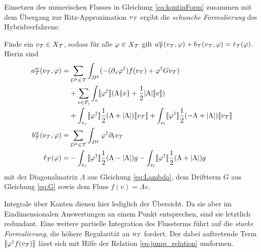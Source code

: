 Einsetzen des numerischen Flusses in Gleichung \eqref{eq:kontinForm} zusammen mit dem Übergang zur Ritz-Approximation $v_{\mathcal{T}}$ ergibt die \emph{schwache Formulierung} des Hybridverfahrens:
\begin{problem}
  \label{prob:weak}
  Finde ein ${v_{\mathcal{T}}\in X_{\mathcal{T}}}$, sodass für alle $\varphi\in X_{\mathcal{T}}$ gilt $a_{\mathcal{T}}^w(v_{\mathcal{T}}, \varphi) + b_{\mathcal{T}}(v_{\mathcal{T}}, \varphi) = \ell_{\mathcal{T}}(\varphi)$. Hierin sind
  \begin{align}
    a_{\mathcal{T}}^w(v_{\mathcal{T}}, \varphi) = &\sum_{D^k\in\mathcal{T}}\int_{D^k} ( - (\partial_x \varphi^{\dagger}) f(v_{\mathcal{T}}) + \varphi^{\dagger} G v_{\mathcal{T}}) \nonumber \\
    &+ \sum_{e\in F_i}\int_{e}\llbracket \varphi^{\dagger} \rrbracket (\Lambda\{ v \} + \frac{1}{2}|\Lambda|\llbracket v \rrbracket) \\
    &+ \int_{e_r} \llbracket \varphi^{\dagger} \rrbracket \frac{1}{2}(\Lambda + |\Lambda|)\llbracket v_{\mathcal{T}} \rrbracket
    + \int_{e_l} \llbracket \varphi^{\dagger} \rrbracket \frac{1}{2}(-\Lambda + |\Lambda|)\llbracket v_{\mathcal{T}} \rrbracket \nonumber \\
    b_{\mathcal{T}}^w(v_{\mathcal{T}}, \varphi) = &\sum_{D^k\in\mathcal{T}}\int_{D^k} \varphi^{\dagger} \partial_t v_{\mathcal{T}} \\
    \ell_{\mathcal{T}}(\varphi)  = &-\int_{e_r} \llbracket \varphi^{\dagger} \rrbracket \frac{1}{2}(\Lambda - |\Lambda|)g
      -\int_{e_l} \llbracket \varphi^{\dagger} \rrbracket \frac{1}{2}(\Lambda + |\Lambda|)g
  \end{align}
  mit der Diagonalmatrix $\Lambda$ aus Gleichung \eqref{eq:Lambda}, dem Driftterm $G$ aus Gleichung \eqref{eq:G} sowie dem Fluss ${f(v)=\Lambda v}$.
\end{problem}
Integrale über Kanten dienen hier lediglich der Übersicht. Da sie aber im Eindimensionalen Auswertungen an einem Punkt entsprechen, sind sie letztlich redundant. Eine weitere partielle Integration des Flussterms führt auf die \emph{starke Formulierung}, die höhere Regularität an $u_{\mathcal{T}}$ fordert. Der dabei auftretende Term $\llbracket \varphi^{\dagger}f(v_{\mathcal{T}}) \rrbracket$ lässt sich mit Hilfe der Relation \eqref{eq:jump_relation} umformen.
